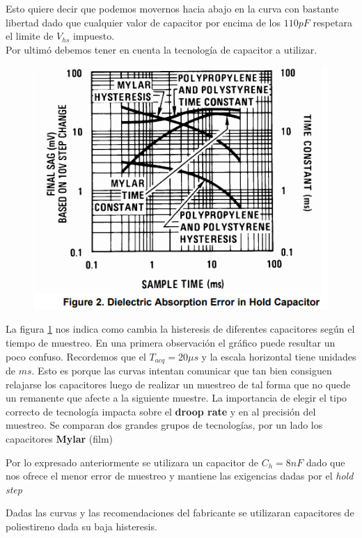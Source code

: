 Esto quiere decir que podemos movernos hacia abajo en la curva con bastante libertad dado que cualquier valor de capacitor por encima de los $110pF$ respetara el limite de $V_{hs}$ impuesto.\\
Por ultimó debemos tener en cuenta la tecnología de capacitor a utilizar.
\begin{figure}[H]
	\centering
	\includegraphics[scale=0.7]{ImagenesEjercicio4/AbsorcionDielectrico}
	\caption{}
	\label{fig:absorciondielectrico}
\end{figure}
La figura \ref{fig:absorciondielectrico} nos indica como cambia la histeresis de diferentes capacitores según el tiempo de muestreo. En una primera observación el gráfico puede resultar un poco confuso. Recordemos que el $T_{acq}=20\mu s$ y la escala horizontal tiene unidades de $ms$. Esto es porque las curvas intentan comunicar que tan bien consiguen relajarse los capacitores luego de realizar un muestreo de tal forma que no quede un remanente que afecte a la siguiente muestre.
La importancia de elegir el tipo correcto de tecnología impacta sobre el \textbf{droop rate} y en al precisión del muestreo. Se comparan dos grandes grupos de tecnologías, por un lado los capacitores \textbf{Mylar} (film)

Por lo expresado anteriormente se utilizara un capacitor de $C_h = 8nF$ dado que nos ofrece el menor error de muestreo y mantiene las exigencias dadas por el \textit{hold step}

Dadas las curvas y las recomendaciones del fabricante se utilizaran capacitores de poliestireno dada su baja histeresis.

